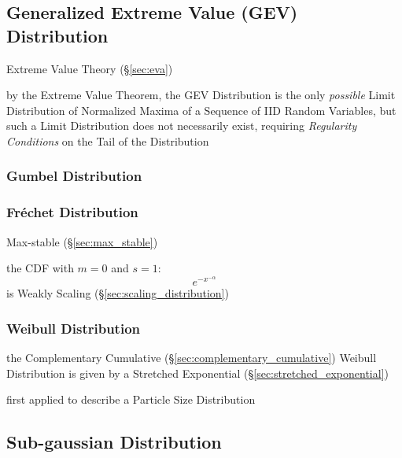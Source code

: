 \subsection{Generalized Extreme Value (GEV) Distribution}\label{sec:gev}

Extreme Value Theory (\S\ref{sec:eva})

by the Extreme Value Theorem, the GEV Distribution is the only \emph{possible}
Limit Distribution of Normalized Maxima of a Sequence of IID Random Variables,
but such a Limit Distribution does not necessarily exist, requiring
\emph{Regularity Conditions} on the Tail of the Distribution



\subsubsection{Gumbel Distribution}\label{sec:gumbel_distribution}

\subsubsection{Fr\'echet Distribution}\label{sec:frechet_distribution}

Max-stable (\S\ref{sec:max_stable})

the CDF with $m = 0$ and $s = 1$:
\[
  e^{-x^{-\alpha}}
\]
is Weakly Scaling (\S\ref{sec:scaling_distribution})



\subsubsection{Weibull Distribution}\label{sec:weibull_distribution}

the Complementary Cumulative (\S\ref{sec:complementary_cumulative}) Weibull
Distribution is given by a Stretched Exponential
(\S\ref{sec:stretched_exponential})

first applied to describe a Particle Size Distribution



\subsection{Sub-gaussian Distribution}\label{sec:sub_gaussian}

